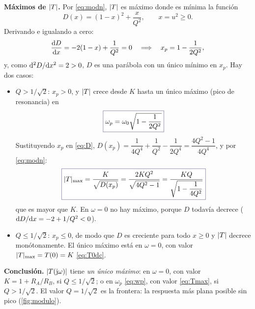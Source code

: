 \begin{resolucion}
\textbf{Máximos de $\lvert T\rvert$.} Por \eqref{eq:modn}, $\lvert T\rvert$ es máximo donde es mínima la función
\begin{equation}\label{eq:D}
  D(x)=(1-x)^{2}+\frac{x}{Q^{2}},\qquad x=u^{2}\ge0 .
\end{equation}
Derivando e igualando a cero:
\begin{equation}\label{eq:dD}
  \frac{\mathrm{d} D}{\mathrm{d} x}=-2(1-x)+\frac{1}{Q^{2}}=0\quad\Longrightarrow\quad x_p=1-\frac{1}{2Q^{2}},
\end{equation}
y, como $\mathrm{d}^{2}D/\mathrm{d} x^{2}=2>0$, $D$ es una parábola con un único mínimo en $x_p$. Hay dos casos:
\begin{itemize}
  \item \emph{$Q>1/\sqrt2$}: $x_p>0$, y $\lvert T\rvert$ crece desde $K$ hasta un único máximo (pico de resonancia) en
        \begin{equation}\label{eq:wp}
          \resultado{\omega_p=\omega_0\sqrt{1-\frac{1}{2Q^{2}}}}
        \end{equation}
        Sustituyendo $x_p$ en \eqref{eq:D}, $D(x_p)=\dfrac{1}{4Q^{4}}+\dfrac{1}{Q^{2}}-\dfrac{1}{2Q^{4}}=\dfrac{4Q^{2}-1}{4Q^{4}}$,
        y por \eqref{eq:modn}:
        \begin{equation}\label{eq:Tmax}
          \resultado{\abs{T}_{\max}=\frac{K}{\sqrt{D(x_p)}}=\frac{2KQ^{2}}{\sqrt{4Q^{2}-1}}=\frac{KQ}{\sqrt{1-\dfrac{1}{4Q^{2}}}}}
        \end{equation}
        que es mayor que $K$. En $\omega=0$ no hay máximo, porque $D$ todavía decrece ($\mathrm{d} D/\mathrm{d} x=-2+1/Q^{2}<0$).
  \item \emph{$Q\le1/\sqrt2$}: $x_p\le0$, de modo que $D$ es creciente para todo $x\ge0$ y $\lvert T\rvert$ decrece
        monótonamente. El único máximo está en $\omega=0$, con valor $\lvert T\rvert_{\max}=T(0)=K$ \eqref{eq:T0dc}.
\end{itemize}

\textbf{Conclusión.} $\lvert T(\mathrm{j}\omega)\rvert$ tiene \emph{un único máximo}: en $\omega=0$, con valor $K=1+R_A/R_B$, si
$Q\le1/\sqrt2$; o en $\omega_p$ \eqref{eq:wp}, con valor \eqref{eq:Tmax}, si $Q>1/\sqrt2$. El valor
$Q=1/\sqrt2$ es la frontera: la respuesta más plana posible sin pico (\cref{fig:modulo}).
\end{resolucion}


